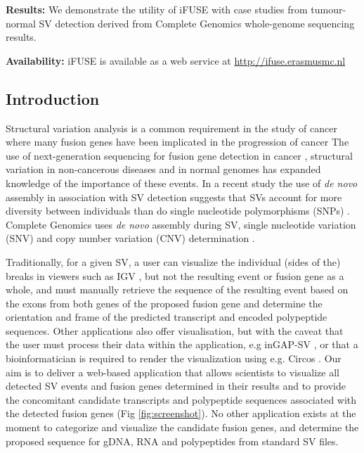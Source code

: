 \textbf{Results:} We demonstrate the utility of iFUSE with case studies from tumour-normal SV detection derived from Complete Genomics whole-genome sequencing results.

\textbf{Availability:} iFUSE is available as a web service at \url{http://ifuse.erasmusmc.nl}


\subsection*{Introduction}

Structural variation analysis is a common requirement in the study of cancer where many fusion genes have been implicated in the progression of cancer \cite{review1, review2}
The use of next-generation sequencing for fusion gene detection in cancer \cite{edgren, fusionmap, defuse}, structural variation in non-cancerous diseases \cite{rareallele, rareallele2} and in normal genomes \cite{1000Genomes} has expanded knowledge of the importance of these events.
In a recent study the use of \textit{de novo} assembly in association with SV detection suggests that SVs account for more diversity between individuals than do single nucleotide polymorphisms (SNPs) \cite{li}. Complete Genomics uses \textit{de novo} assembly during SV, single nucleotide variation (SNV) and copy number variation (CNV) determination \cite{carnevali}.

Traditionally, for a given SV, a user can visualize the individual (sides of the) breaks in viewers such as IGV \cite{igv, igv2}, but not the resulting event or fusion gene as a whole, and must manually retrieve the sequence of the resulting event based on the exons from both genes of the proposed fusion gene and determine the orientation and frame of the predicted transcript and encoded polypeptide sequences. Other applications also offer visualisation, but with the caveat that the user must process their data within the application, e.g inGAP-SV \cite{ingap-sv}, or that a bioinformatician is required to render the visualization using e.g. Circos \cite{circos}. Our aim is to deliver a web-based application that allows scientists to visualize all detected SV events and fusion genes determined in their results and to provide the concomitant candidate transcripts and polypeptide sequences associated with the detected fusion genes (Fig \ref{fig:screenshot}). No other application exists at the moment to categorize and visualize the candidate fusion genes, and determine the proposed sequence for gDNA, RNA and polypeptides from standard SV files.

